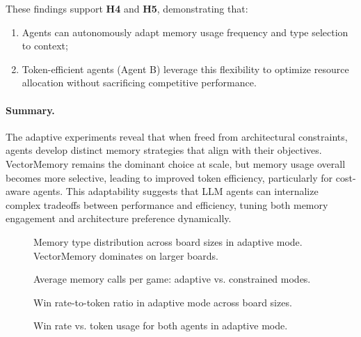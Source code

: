 \documentclass[10pt]{article}
\begin{document}
These findings support \textbf{H4} and \textbf{H5}, demonstrating that:
\begin{enumerate}[leftmargin=*,nosep]
    \item Agents can autonomously adapt memory usage frequency and type selection to context;
    \item Token-efficient agents (Agent B) leverage this flexibility to optimize resource allocation without sacrificing competitive performance.
\end{enumerate}

\paragraph{Summary.}  
The adaptive experiments reveal that when freed from architectural constraints, agents develop distinct memory strategies that align with their objectives. VectorMemory remains the dominant choice at scale, but memory usage overall becomes more selective, leading to improved token efficiency, particularly for cost-aware agents. This adaptability suggests that LLM agents can internalize complex tradeoffs between performance and efficiency, tuning both memory engagement and architecture preference dynamically.

\begin{figure}[ht]
\centering
\caption{Memory type distribution across board sizes in adaptive mode. VectorMemory dominates on larger boards.}
\label{fig:adaptive_memory_type}
\end{figure}

\begin{figure}[ht]
\centering
\caption{Average memory calls per game: adaptive vs. constrained modes.}
\label{fig:adaptive_memory_frequency}
\end{figure}

\begin{figure}[ht]
\centering
\caption{Win rate-to-token ratio in adaptive mode across board sizes.}
\label{fig:adaptive_token_efficiency}
\end{figure}

\begin{figure}[ht]
\centering
\caption{Win rate vs. token usage for both agents in adaptive mode.}
\label{fig:adaptive_performance_tradeoff}
\end{figure}
\end{document}
